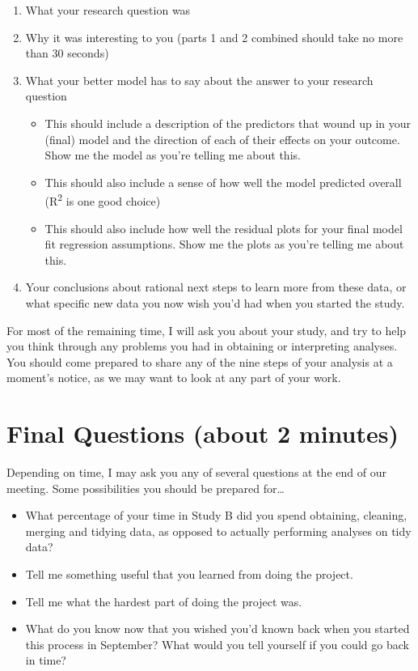 \documentclass[]{book}
\providecommand{\tightlist}{%
  \setlength{\itemsep}{0pt}\setlength{\parskip}{0pt}}
\begin{document}
\begin{enumerate}
\def\labelenumi{\alph{enumi}.}
\tightlist
\item
  What your research question was
\item
  Why it was interesting to you (parts 1 and 2 combined should take no more than 30 seconds)
\item
  What your better model has to say about the answer to your research question

  \begin{itemize}
  \tightlist
  \item
    This should include a description of the predictors that wound up in your (final) model and the direction of each of their effects on your outcome. Show me the model as you're telling me about this.
  \item
    This should also include a sense of how well the model predicted overall (R\textsuperscript{2} is one good choice)
  \item
    This should also include how well the residual plots for your final model fit regression assumptions. Show me the plots as you're telling me about this.
  \end{itemize}
\item
  Your conclusions about rational next steps to learn more from these data, or what specific new data you now wish you'd had when you started the study.
\end{enumerate}

For most of the remaining time, I will ask you about your study, and try to help you think through any problems you had in obtaining or interpreting analyses. You should come prepared to share any of the nine steps of your analysis at a moment's notice, as we may want to look at any part of your work.

\hypertarget{final-questions-about-2-minutes}{%
\section{Final Questions (about 2 minutes)}\label{final-questions-about-2-minutes}}

Depending on time, I may ask you any of several questions at the end of our meeting. Some possibilities you should be prepared for\ldots{}

\begin{itemize}
\tightlist
\item
  What percentage of your time in Study B did you spend obtaining, cleaning, merging and tidying data, as opposed to actually performing analyses on tidy data?
\item
  Tell me something useful that you learned from doing the project.
\item
  Tell me what the hardest part of doing the project was.
\item
  What do you know now that you wished you'd known back when you started this process in September? What would you tell yourself if you could go back in time?
\end{itemize}
\end{document}
